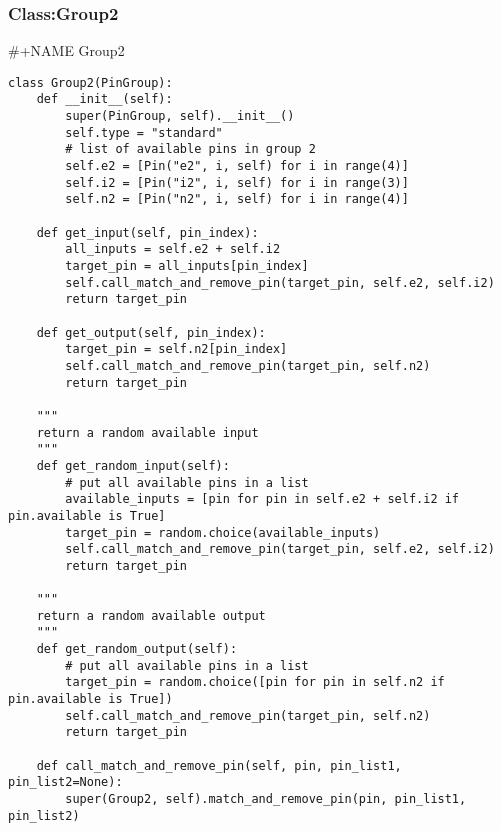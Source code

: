 \documentclass[a4paper]{article}
\begin{document}
\subsubsection{Class:Group2}
\label{sec-4-5-2}
\#+NAME Group2
\begin{verbatim}
class Group2(PinGroup):
    def __init__(self):
        super(PinGroup, self).__init__()
        self.type = "standard"
        # list of available pins in group 2
        self.e2 = [Pin("e2", i, self) for i in range(4)]
        self.i2 = [Pin("i2", i, self) for i in range(3)]
        self.n2 = [Pin("n2", i, self) for i in range(4)]

    def get_input(self, pin_index):
        all_inputs = self.e2 + self.i2
        target_pin = all_inputs[pin_index]
        self.call_match_and_remove_pin(target_pin, self.e2, self.i2)
        return target_pin

    def get_output(self, pin_index):
        target_pin = self.n2[pin_index]
        self.call_match_and_remove_pin(target_pin, self.n2)
        return target_pin

    """
    return a random available input
    """
    def get_random_input(self):
        # put all available pins in a list
        available_inputs = [pin for pin in self.e2 + self.i2 if pin.available is True]
        target_pin = random.choice(available_inputs)
        self.call_match_and_remove_pin(target_pin, self.e2, self.i2)
        return target_pin

    """
    return a random available output
    """
    def get_random_output(self):
        # put all available pins in a list
        target_pin = random.choice([pin for pin in self.n2 if pin.available is True])
        self.call_match_and_remove_pin(target_pin, self.n2)
        return target_pin

    def call_match_and_remove_pin(self, pin, pin_list1, pin_list2=None):
        super(Group2, self).match_and_remove_pin(pin, pin_list1, pin_list2)
\end{verbatim}
\end{document}

